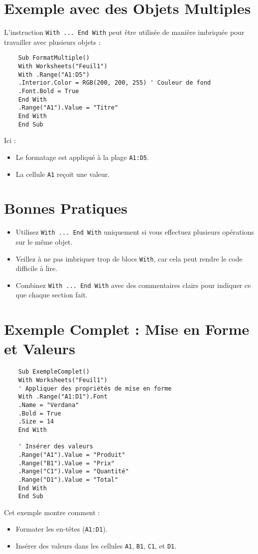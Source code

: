 \documentclass[a4paper,12pt]{report}
\begin{document}
\section{Exemple avec des Objets Multiples}
L'instruction \texttt{With ... End With} peut être utilisée de manière imbriquée pour travailler avec plusieurs objets :
\begin{lstlisting}
	Sub FormatMultiple()
	With Worksheets("Feuil1")
	With .Range("A1:D5")
	.Interior.Color = RGB(200, 200, 255) ' Couleur de fond
	.Font.Bold = True
	End With
	.Range("A1").Value = "Titre"
	End With
	End Sub
\end{lstlisting}

Ici :
\begin{itemize}
	\item Le formatage est appliqué à la plage \texttt{A1:D5}.
	\item La cellule \texttt{A1} reçoit une valeur.
\end{itemize}

\section{Bonnes Pratiques}
\begin{itemize}
	\item Utilisez \texttt{With ... End With} uniquement si vous effectuez plusieurs opérations sur le même objet.
	\item Veillez à ne pas imbriquer trop de blocs \texttt{With}, car cela peut rendre le code difficile à lire.
	\item Combinez \texttt{With ... End With} avec des commentaires clairs pour indiquer ce que chaque section fait.
\end{itemize}
\newpage
\section{Exemple Complet : Mise en Forme et Valeurs}
\begin{lstlisting}
	Sub ExempleComplet()
	With Worksheets("Feuil1")
	' Appliquer des propriétés de mise en forme
	With .Range("A1:D1").Font
	.Name = "Verdana"
	.Bold = True
	.Size = 14
	End With
	
	' Insérer des valeurs
	.Range("A1").Value = "Produit"
	.Range("B1").Value = "Prix"
	.Range("C1").Value = "Quantité"
	.Range("D1").Value = "Total"
	End With
	End Sub
\end{lstlisting}

Cet exemple montre comment :
\begin{itemize}
	\item Formater les en-têtes (\texttt{A1:D1}).
	\item Insérer des valeurs dans les cellules \texttt{A1}, \texttt{B1}, \texttt{C1}, et \texttt{D1}.
\end{itemize}
\end{document}

